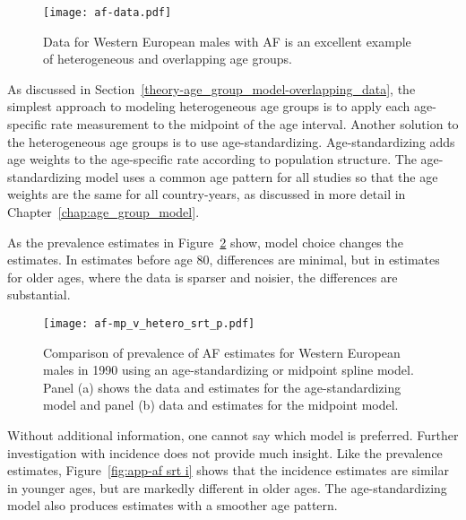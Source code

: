     \begin{figure}[h]
        \begin{center}
            \texttt{[image: af-data.pdf]}
            \caption{Data for Western European males with
              AF is an excellent example of heterogeneous
              and overlapping age groups.}
            \label{fig:app-af data}
        \end{center}
    \end{figure}

As discussed in Section~\ref{theory-age_group_model-overlapping_data},
the simplest approach to modeling heterogeneous age groups is to apply
each age-specific rate measurement to the midpoint of the age interval.
Another solution to the heterogeneous age groups is to use age-standardizing.
Age-standardizing adds age weights to the age-specific rate according
to population structure.  The age-standardizing model uses a common
age pattern for all studies so that the age weights are the same for
all country-years, as discussed in more detail in Chapter~\ref{chap:age_group_model}.

As the prevalence estimates in Figure~\ref{fig:app-af srt p} show,
model choice changes the estimates.  In estimates before age 80,
differences are minimal, but in estimates for older ages, where the
data is sparser and noisier, the differences are substantial.

    \begin{figure}[h]
        \begin{center}
            \texttt{[image: af-mp\_v\_hetero\_srt\_p.pdf]}
            \caption{Comparison of prevalence of AF estimates for Western European
              males in 1990 using an age-standardizing
              or midpoint spline model.  Panel (a) shows the data and
              estimates for the age-standardizing model and panel (b)
              data and estimates for the midpoint model.}
            \label{fig:app-af srt p}
        \end{center}
    \end{figure}

Without additional information, one cannot say which model is preferred.
Further investigation with incidence does not provide much insight.  Like
the prevalence estimates, Figure~\ref{fig:app-af srt i} shows that the
incidence estimates are similar in younger ages, but are markedly different
in older ages.  The age-standardizing model also produces estimates with a
smoother age pattern.

